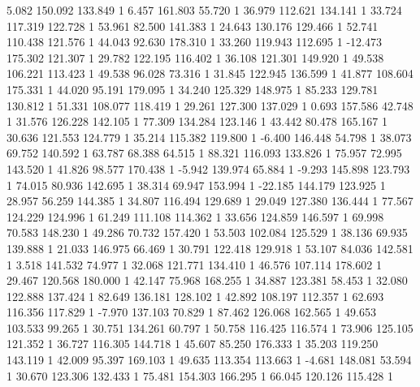 	5.082 150.092 133.849 1
	6.457 161.803 55.720 1
	36.979 112.621 134.141 1
	33.724 117.319 122.728 1
	53.961 82.500 141.383 1
	24.643 130.176 129.466 1
	52.741 110.438 121.576 1
	44.043 92.630 178.310 1
	33.260 119.943 112.695 1
	-12.473 175.302 121.307 1
	29.782 122.195 116.402 1
	36.108 121.301 149.920 1
	49.538 106.221 113.423 1
	49.538 96.028 73.316 1
	31.845 122.945 136.599 1
	41.877 108.604 175.331 1
	44.020 95.191 179.095 1
	34.240 125.329 148.975 1
	85.233 129.781 130.812 1
	51.331 108.077 118.419 1
	29.261 127.300 137.029 1
	0.693 157.586 42.748 1
	31.576 126.228 142.105 1
	77.309 134.284 123.146 1
	43.442 80.478 165.167 1
	30.636 121.553 124.779 1
	35.214 115.382 119.800 1
	-6.400 146.448 54.798 1
	38.073 69.752 140.592 1
	63.787 68.388 64.515 1
	88.321 116.093 133.826 1
	75.957 72.995 143.520 1
	41.826 98.577 170.438 1
	-5.942 139.974 65.884 1
	-9.293 145.898 123.793 1
	74.015 80.936 142.695 1
	38.314 69.947 153.994 1
	-22.185 144.179 123.925 1
	28.957 56.259 144.385 1
	34.807 116.494 129.689 1
	29.049 127.380 136.444 1
	77.567 124.229 124.996 1
	61.249 111.108 114.362 1
	33.656 124.859 146.597 1
	69.998 70.583 148.230 1
	49.286 70.732 157.420 1
	53.503 102.084 125.529 1
	38.136 69.935 139.888 1
	21.033 146.975 66.469 1
	30.791 122.418 129.918 1
	53.107 84.036 142.581 1
	3.518 141.532 74.977 1
	32.068 121.771 134.410 1
	46.576 107.114 178.602 1
	29.467 120.568 180.000 1
	42.147 75.968 168.255 1
	34.887 123.381 58.453 1
	32.080 122.888 137.424 1
	82.649 136.181 128.102 1
	42.892 108.197 112.357 1
	62.693 116.356 117.829 1
	-7.970 137.103 70.829 1
	87.462 126.068 162.565 1
	49.653 103.533 99.265 1
	30.751 134.261 60.797 1
	50.758 116.425 116.574 1
	73.906 125.105 121.352 1
	36.727 116.305 144.718 1
	45.607 85.250 176.333 1
	35.203 119.250 143.119 1
	42.009 95.397 169.103 1
	49.635 113.354 113.663 1
	-4.681 148.081 53.594 1
	30.670 123.306 132.433 1
	75.481 154.303 166.295 1
	66.045 120.126 115.428 1
